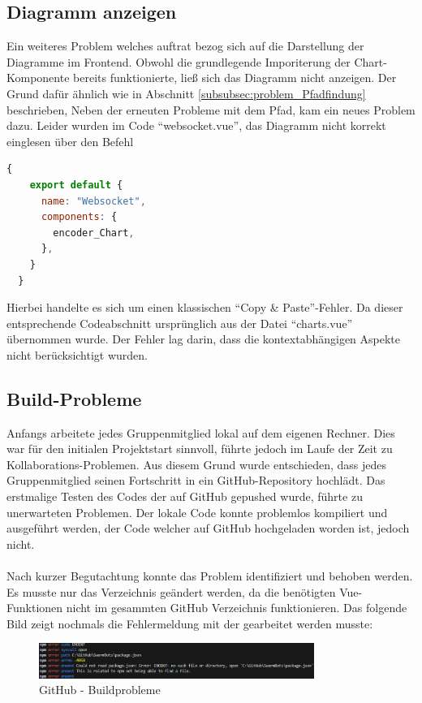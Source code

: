 \subsection{Diagramm anzeigen}
\label{subsubsec:problem_chart_anzeige}
Ein weiteres Problem welches auftrat
bezog sich auf die Darstellung der Diagramme im Frontend.
%
Obwohl die grundlegende Imporiterung der Chart-Komponente bereits funktionierte, 
ließ sich das Diagramm nicht anzeigen.
%
Der Grund dafür ähnlich wie in Abschnitt \ref{subsubsec:problem_Pfadfindung} beschrieben,
%
Neben der erneuten Probleme mit dem Pfad, kam ein neues Problem dazu. 
Leider wurden im Code ``websocket.vue'', das Diagramm nicht korrekt einglesen über den Befehl
\begin{lstlisting}[language=JavaScript, gobble=4]
  {
    export default {
      name: "Websocket",
      components: {
        encoder_Chart,
      },
    }
  }
\end{lstlisting}
Hierbei handelte es sich um einen klassischen ``Copy \& Paste''-Fehler.
Da dieser entsprechende Codeabschnitt ursprünglich aus der Datei ``charts.vue'' übernommen wurde.
%
Der Fehler lag darin, dass die kontextabhängigen Aspekte nicht berücksichtigt wurden. 

\subsection{Build-Probleme}
\label{subsubsec:problem_Builden}
Anfangs arbeitete jedes Gruppenmitglied lokal auf dem eigenen Rechner.
%
Dies war für den initialen Projektstart sinnvoll, 
führte jedoch im Laufe der Zeit zu Kollaborations-Problemen. 
%
Aus diesem Grund wurde entschieden, dass jedes Gruppenmitglied seinen Fortschritt 
in ein GitHub-Repository hochlädt. 
%
Das erstmalige Testen des Codes der auf GitHub gepushed wurde, führte zu unerwarteten Problemen.
Der lokale Code konnte problemlos kompiliert und ausgeführt werden, 
der Code welcher auf GitHub hochgeladen worden ist, jedoch nicht.
%
\\\\
Nach kurzer Begutachtung konnte das Problem identifiziert und behoben werden.
Es musste nur das Verzeichnis geändert werden, 
da die benötigten Vue-Funktionen nicht im gesammten GitHub Verzeichnis funktionieren.
%
Das folgende Bild zeigt nochmals die Fehlermeldung mit der gearbeitet werden musste:
\begin{figure}[H]
  \includegraphics[width=0.8\textwidth, center]{img/GitHub_Buildprobleme.png}
  \caption{GitHub - Buildprobleme}
  \label{fig:GitHub_Buildprobleme}
\end{figure}
